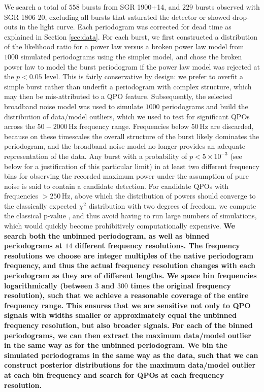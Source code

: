 \documentclass[numberedappendix]{emulateapj}
\newcommand{\hz}{\,\mathrm{Hz}}
\begin{document}
We search a total of $558$ bursts from SGR 1900+14, and $229$ bursts observed with SGR 1806-20, excluding all bursts that saturated the detector or showed drop-outs in the light curve. 
Each periodogram was corrected for dead time as explained in Section \ref{sec:data}. 
For each burst, we first constructed a distribution of the likelihood ratio for a power law versus a broken power law model from $1000$ simulated periodograms using the simpler model, and
chose the broken power law to model the burst periodogram if the power law model was rejected at the $p < 0.05$ level. This is fairly conservative by design: we prefer to overfit a simple burst rather than underfit a periodogram 
with complex structure, which may then be mis-attributed to a QPO feature. Subsequently, the selected broadband noise model was used to simulate $1000$ periodograms and build the
distribution of data/model outliers, which we used to test for significant QPOs across the $50 - 2000 \hz$ frequency range. Frequencies below $50 \, \mathrm{Hz}$ are discarded, because on these timescales the overall structure of
the burst likely dominates the periodogram, and the broadband noise model no longer provides an adequate representation of the data. Any burst with a probability of $p < 5 \times 10^{-3}$ (see below for a justification of this particular limit) in at least two different frequency bins
for observing the recorded maximum power under the assumption of pure noise is said to contain a candidate detection. For candidate QPOs with frequencies $> 250 \hz$, above which the distribution of powers
should converge to the classically expected $\chi^2$ distribution with two degrees of freedom, we compute the classical p-value \citep{groth1975}, and thus avoid having to run large numbers of simulations, which 
would quickly become prohibitively computationally expensive. 
\textbf{We search both the unbinned periodogram, as well as binned periodograms at $14$ different frequency resolutions. The frequency resolutions we choose are integer multiples of the native periodogram frequency, and thus the actual frequency resolution changes with each periodogram as they are of different lengths. We space bin frequencies logarithmically (between $3$ and $300$ times the original frequency resolution), such that we achieve a reasonable coverage of the entire frequency range. This ensures that we are sensitive not only to QPO signals with widths smaller or approximately equal the unbinned frequency resolution, but also broader signals. For each of the binned periodograms, we can then extract the maximum data/model outlier in the same way as for the unbinned periodogram. We bin the simulated periodograms in the same way as the data, such that we can construct posterior distributions for the maximum data/model outlier at each bin frequency and search for QPOs at each frequency resolution.}
\end{document}
